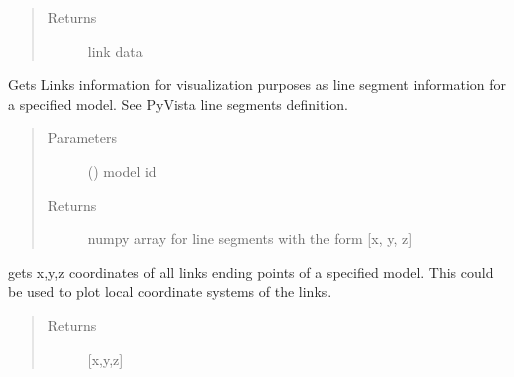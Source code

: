 \documentclass[letterpaper,10pt,english]{sphinxmanual}
\begin{document}
\begin{fulllineitems}
\begin{fulllineitems}
\begin{quote}
\begin{description}
\item[{Returns}] \leavevmode
link data

\end{description}\end{quote}

\end{fulllineitems}


\begin{fulllineitems}
\label{\detokenize{api:beamon.database.database.Database.get_links}}
Gets Links information for visualization purposes as line segment information for a specified model.
See PyVista line segments definition.
\begin{quote}\begin{description}
\item[{Parameters}] \leavevmode
{} () \textendash{} model id

\item[{Returns}] \leavevmode
numpy array for line segments with the form {[}x, y, z{]}

\end{description}\end{quote}

\end{fulllineitems}


\begin{fulllineitems}
\label{\detokenize{api:beamon.database.database.Database.get_links_ending_points}}
gets x,y,z coordinates of all links ending points of a specified model.
This could be used to plot local coordinate systems of the links.
\begin{quote}\begin{description}
\item[{Returns}] \leavevmode
{[}x,y,z{]}


\end{description}
\end{quote}
\end{fulllineitems}
\end{fulllineitems}
\end{document}
